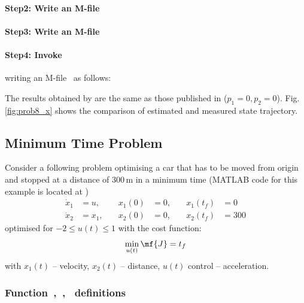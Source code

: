 \paragraph{Step2: Write an M-file~}

{\small }

\paragraph{Step3: Write an M-file~}

{\small }

\paragraph{Step4: Invoke~} writing an
M-file~ as follows:

{\small }

The results obtained by  are the same as those published
in \cite{fik02} ($p_1=0, p_2 = 0$). Fig. \ref{fig:prob8_x} shows the
comparison of estimated and measured state trajectory.

\subsection{Minimum Time Problem}
\label{sec:car}

Consider a following problem optimising a car that has to be moved
from origin and stopped at a distance of 300\,m in a minimum time
(MATLAB code for this example is located at
)
\begin{align}
\dot{x}_1 &= u, \quad  &x_{1}(0) &= 0 , \quad  &x_{1}(t_f) &= 0 \\
\dot{x}_2 &= x_{1}, \quad &x_{2}(0) &= 0, \quad  &x_{2}(t_f) &= 300  
\end{align} 
optimised for $-2 \leq u(t) \leq 1$ with the cost function:
\begin{equation} \label{eq:car}
\min_{u(t)} \mf{J} = t_{f} 
\end{equation} 
with $x_1(t)$ -- velocity, $x_2(t)$ -- distance, $u(t)$ control --
acceleration.

\subsubsection{Function~,~,~  definitions}
\label{sec:car-fundef}

